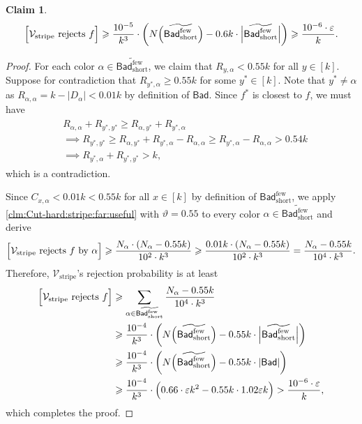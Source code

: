 \documentclass[11pt,fleqn]{article}
\renewcommand{\geq}{\geqslant}
\renewcommand{\epsilon}{\varepsilon}
\renewcommand{\theta}{\vartheta}
\renewcommand{\tilde}{\widetilde}
\newcommand{\V}{\calV}
\newcommand{\f}{f}
\newcommand{\Vstripe}{\V_\mathrm{stripe}}
\newcommand{\Bad}{\mathsf{Bad}}
\newcommand{\Badlss}{\Bad^\mathrm{few}}
\newcommand{\BadlssS}{\Badlss_\mathrm{short}}
\newcommand{\calV}{\mathcal{V}}
\let\Pr\relax\DeclareMathOperator*{\Pr}{\mathbb{P}}
\newtheorem{claim}[theorem]{Claim}
\theoremstyle{definition}
\numberwithin{equation}{section}
\begin{document}
\begin{claim}
\label{clm:Cut-hard:stripe:far:2222}
    \begin{align}
        \Pr\Bigl[ \Vstripe \text{ rejects } \f \Bigr]
        \geq \frac{10^{-5}}{k^3} \cdot \left(
            N\Bigl(\tilde{\BadlssS}\Bigr) - 0.6k \cdot \Bigl|\tilde{\BadlssS}\Bigr|
        \right)
        \geq \frac{10^{-6} \cdot \epsilon}{k}.
    \end{align}
\end{claim}
\begin{proof}
For each color $\alpha \in \tilde{\BadlssS}$,
we claim that $R_{y,\alpha} < 0.55k$ for all $y \in [k]$.
Suppose for contradiction that
$R_{y^*,\alpha} \geq 0.55k$ for some $y^* \in [k]$.
Note that $y^* \neq \alpha$ as
$R_{\alpha, \alpha} = k-|D_\alpha| < 0.01k$ by definition of $\Bad$.
Since $\f^*$ is closest to $\f$, we must have
\begin{align}
\begin{aligned}
    & R_{\alpha,\alpha} + R_{y^*,y^*} \geq R_{\alpha,y^*} + R_{y^*,\alpha} \\
    & \implies R_{y^*,y^*}
    \geq R_{\alpha,y^*} + R_{y^*,\alpha} - R_{\alpha,\alpha}
    \geq R_{y^*,\alpha} - R_{\alpha,\alpha}
    > 0.54k \\
    & \implies R_{y^*,\alpha} + R_{y^*,y^*} > k,
\end{aligned}
\end{align}
which is a contradiction.

Since $C_{x,\alpha} < 0.01k < 0.55k$ for all $x \in [k]$ by definition of $\BadlssS$,
we apply \cref{clm:Cut-hard:stripe:far:useful} with $\theta = 0.55$
to every color $\alpha \in \tilde{\BadlssS}$ and derive
\begin{align}
    \Pr\Bigl[ \Vstripe \text{ rejects } \f \text{ by } \alpha \Bigr]
    \geq \frac{N_\alpha \cdot (N_\alpha - 0.55k)}{10^2 \cdot k^3}
    \geq \frac{0.01k \cdot (N_\alpha - 0.55k)}{10^2 \cdot k^3}
    = \frac{N_\alpha - 0.55k}{10^4 \cdot k^3}.
\end{align}
Therefore, $\Vstripe$'s rejection probability is at least
\begin{align}
\begin{aligned}
    \Pr\Bigl[ \Vstripe \text{ rejects } \f \Bigr]
    & \geq \sum_{\alpha \in \tilde{\BadlssS}} \frac{N_\alpha - 0.55k}{10^4 \cdot k^3} \\
    & \geq \frac{10^{-4}}{k^3} \cdot \left(
        N\Bigl(\tilde{\BadlssS}\Bigr) - 0.55k \cdot \Bigl|\tilde{\BadlssS}\Bigr|
    \right) \\
    & \geq \frac{10^{-4}}{k^3} \cdot \left(
        N\Bigl(\tilde{\BadlssS}\Bigr) - 0.55k \cdot |\Bad|
    \right) \\
    & \geq \frac{10^{-4}}{k^3} \cdot \Bigl(
        0.66 \cdot \epsilon k^2 - 0.55k \cdot 1.02\epsilon k
    \Bigr)
    > \frac{10^{-6} \cdot \epsilon}{k},
\end{aligned}
\end{align}
which completes the proof.
\end{proof}
\end{document}
